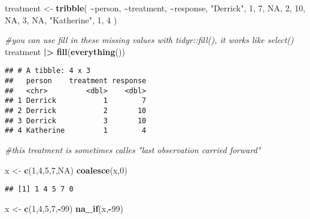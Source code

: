 \documentclass[
]{article}
\newenvironment{Shaded}{\begin{snugshade}}{\end{snugshade}}
\newcommand{\CommentTok}[1]{\textcolor[rgb]{0.56,0.35,0.01}{\textit{#1}}}
\newcommand{\ConstantTok}[1]{\textcolor[rgb]{0.56,0.35,0.01}{#1}}
\newcommand{\DecValTok}[1]{\textcolor[rgb]{0.00,0.00,0.81}{#1}}
\newcommand{\FunctionTok}[1]{\textcolor[rgb]{0.13,0.29,0.53}{\textbf{#1}}}
\newcommand{\NormalTok}[1]{#1}
\newcommand{\OtherTok}[1]{\textcolor[rgb]{0.56,0.35,0.01}{#1}}
\newcommand{\SpecialCharTok}[1]{\textcolor[rgb]{0.81,0.36,0.00}{\textbf{#1}}}
\newcommand{\StringTok}[1]{\textcolor[rgb]{0.31,0.60,0.02}{#1}}
\begin{document}
\begin{Shaded}
\begin{Highlighting}[]
\NormalTok{treatment }\OtherTok{\textless{}{-}} \FunctionTok{tribble}\NormalTok{(}
  \SpecialCharTok{\textasciitilde{}}\NormalTok{person, }\SpecialCharTok{\textasciitilde{}}\NormalTok{treatment, }\SpecialCharTok{\textasciitilde{}}\NormalTok{response,}
  \StringTok{"Derrick"}\NormalTok{, }\DecValTok{1}\NormalTok{, }\DecValTok{7}\NormalTok{, }
  \ConstantTok{NA}\NormalTok{, }\DecValTok{2}\NormalTok{, }\DecValTok{10}\NormalTok{,}
  \ConstantTok{NA}\NormalTok{, }\DecValTok{3}\NormalTok{, }\ConstantTok{NA}\NormalTok{,}
  \StringTok{"Katherine"}\NormalTok{, }\DecValTok{1}\NormalTok{, }\DecValTok{4}
\NormalTok{)}

\CommentTok{\#you can use fill in these missing values with tidyr::fill(), it works like select()}
\NormalTok{treatment }\SpecialCharTok{|\textgreater{}}
  \FunctionTok{fill}\NormalTok{(}\FunctionTok{everything}\NormalTok{()) }
\end{Highlighting}
\end{Shaded}

\begin{verbatim}
## # A tibble: 4 x 3
##   person    treatment response
##   <chr>         <dbl>    <dbl>
## 1 Derrick           1        7
## 2 Derrick           2       10
## 3 Derrick           3       10
## 4 Katherine         1        4
\end{verbatim}

\begin{Shaded}
\begin{Highlighting}[]
\CommentTok{\#this treatment is sometimes calles "last observation carried forward"}
\end{Highlighting}
\end{Shaded}

\begin{Shaded}
\begin{Highlighting}[]
\NormalTok{x }\OtherTok{\textless{}{-}} \FunctionTok{c}\NormalTok{(}\DecValTok{1}\NormalTok{,}\DecValTok{4}\NormalTok{,}\DecValTok{5}\NormalTok{,}\DecValTok{7}\NormalTok{,}\ConstantTok{NA}\NormalTok{)}
\FunctionTok{coalesce}\NormalTok{(x,}\DecValTok{0}\NormalTok{)}
\end{Highlighting}
\end{Shaded}

\begin{verbatim}
## [1] 1 4 5 7 0
\end{verbatim}

\begin{Shaded}
\begin{Highlighting}[]
\NormalTok{x }\OtherTok{\textless{}{-}} \FunctionTok{c}\NormalTok{(}\DecValTok{1}\NormalTok{,}\DecValTok{4}\NormalTok{,}\DecValTok{5}\NormalTok{,}\DecValTok{7}\NormalTok{,}\SpecialCharTok{{-}}\DecValTok{99}\NormalTok{)}
\FunctionTok{na\_if}\NormalTok{(x,}\SpecialCharTok{{-}}\DecValTok{99}\NormalTok{)}
\end{Highlighting}
\end{Shaded}
\end{document}

